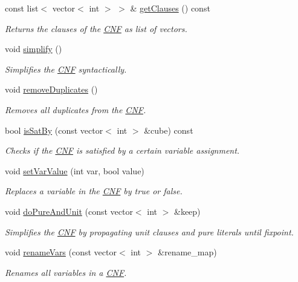 \begin{DoxyCompactItemize}
const list$<$ vector$<$ int $>$ $>$ \& \hyperlink{classCNF_a9532acac619c098668460a4c97cbbc0f}{get\-Clauses} () const 
\begin{DoxyCompactList}\small\item\em Returns the clauses of the \hyperlink{classCNF}{C\-N\-F} as list of vectors. \end{DoxyCompactList}\item 
void \hyperlink{classCNF_a7a3345272f6c5332aa5118e80284f61f}{simplify} ()
\begin{DoxyCompactList}\small\item\em Simplifies the \hyperlink{classCNF}{C\-N\-F} syntactically. \end{DoxyCompactList}\item 
void \hyperlink{classCNF_a08cf05fc87ad59d65b0b03d8d3f61029}{remove\-Duplicates} ()
\begin{DoxyCompactList}\small\item\em Removes all duplicates from the \hyperlink{classCNF}{C\-N\-F}. \end{DoxyCompactList}\item 
bool \hyperlink{classCNF_ac0fc121fe92bc190aeeaf351703fe111}{is\-Sat\-By} (const vector$<$ int $>$ \&cube) const 
\begin{DoxyCompactList}\small\item\em Checks if the \hyperlink{classCNF}{C\-N\-F} is satisfied by a certain variable assignment. \end{DoxyCompactList}\item 
void \hyperlink{classCNF_a6fe7640aa2a65579cf8364092f26c126}{set\-Var\-Value} (int var, bool value)
\begin{DoxyCompactList}\small\item\em Replaces a variable in the \hyperlink{classCNF}{C\-N\-F} by true or false. \end{DoxyCompactList}\item 
void \hyperlink{classCNF_ad7b181b3dbe40f751326c4722d0af84a}{do\-Pure\-And\-Unit} (const vector$<$ int $>$ \&keep)
\begin{DoxyCompactList}\small\item\em Simplifies the \hyperlink{classCNF}{C\-N\-F} by propagating unit clauses and pure literals until fixpoint. \end{DoxyCompactList}\item 
void \hyperlink{classCNF_a8c06c6e3d06a590c3d3e02d87221d431}{rename\-Vars} (const vector$<$ int $>$ \&rename\-\_\-map)
\begin{DoxyCompactList}\small\item\em Renames all variables in a \hyperlink{classCNF}{C\-N\-F}. \end{DoxyCompactList}\item 

\end{DoxyCompactItemize}

